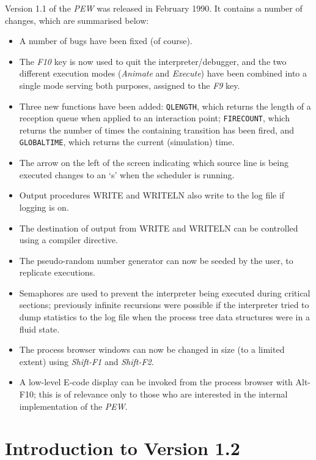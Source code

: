Version 1.1 of the {\em PEW} was released in February 1990. It
contains a number of changes, which are summarised below:
\begin{itemize}
\item A number of bugs have been fixed (of course).
\item The {\em F10} key is now used to quit the interpreter/debugger,
and the two different execution modes ({\em Animate} and {\em
Execute}) have been combined into a single mode serving both
purposes, assigned to the {\em F9} key.
\item Three new functions have been added: {\tt QLENGTH}, which
returns the length of a reception queue when applied to an
interaction point; {\tt FIRECOUNT}, which returns the number of
times the containing transition has been fired, and {\tt GLOBALTIME},
which returns the current (simulation) time.
\item The arrow on the left of the screen indicating which source line 
is being executed changes to an `s' when the scheduler is running.
\item Output procedures WRITE and WRITELN also write to the log file
if logging is on.
\item The destination of output from WRITE and WRITELN can be
controlled using a compiler directive.
\item The pseudo-random number generator can now be seeded by the user, to
replicate executions.
\item Semaphores are used to prevent the interpreter being executed
during critical sections; previously infinite recursions were
possible if the interpreter tried to dump statistics to the log
file when the process tree data structures were in a fluid state.
\item The process browser windows can now be changed in size (to a
limited extent) using {\em Shift-F1} and {\em Shift-F2}.
\item A low-level E-code display can be invoked from the process
browser with Alt-F10; this is of relevance only to those who are
interested in the internal implementation of the {\em PEW}.
\end{itemize}

\section[Introduction to Version 1.2]{Introduction to Version 1.2}

